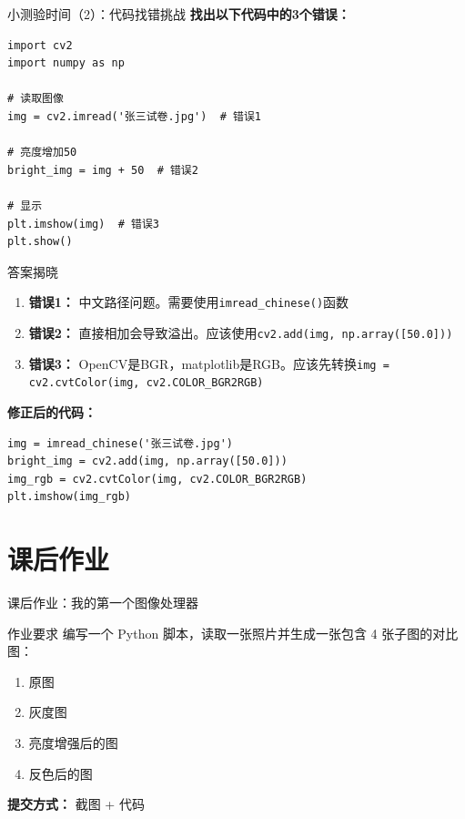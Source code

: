 \begin{frame}[fragile]{小测验时间（2）：代码找错挑战}
    \textbf{找出以下代码中的3个错误：}

    \begin{lstlisting}
import cv2
import numpy as np

# 读取图像
img = cv2.imread('张三试卷.jpg')  # 错误1

# 亮度增加50
bright_img = img + 50  # 错误2

# 显示
plt.imshow(img)  # 错误3
plt.show()
    \end{lstlisting}

    \vspace{0.3cm}
    \begin{block}{答案揭晓}
        \begin{enumerate}
            \item \textbf{错误1：} 中文路径问题。需要使用\texttt{imread\_chinese()}函数
            \item \textbf{错误2：} 直接相加会导致溢出。应该使用\texttt{cv2.add(img, np.array([50.0]))}
            \item \textbf{错误3：} OpenCV是BGR，matplotlib是RGB。应该先转换\texttt{img = cv2.cvtColor(img, cv2.COLOR\_BGR2RGB)}
        \end{enumerate}
    \end{block}

    \vspace{0.3cm}
    \begin{center}
        \textbf{修正后的代码：}
        \begin{lstlisting}
img = imread_chinese('张三试卷.jpg')
bright_img = cv2.add(img, np.array([50.0]))
img_rgb = cv2.cvtColor(img, cv2.COLOR_BGR2RGB)
plt.imshow(img_rgb)
        \end{lstlisting}
    \end{center}
\end{frame}


\section{课后作业}

\begin{frame}[fragile]{课后作业：我的第一个图像处理器}
    \begin{exampleblock}{作业要求}
        编写一个 Python 脚本，读取一张照片并生成一张包含 4 张子图的对比图：
        \begin{enumerate}
            \item 原图
            \item 灰度图
            \item 亮度增强后的图
            \item 反色后的图
        \end{enumerate}
    \end{exampleblock}
    \textbf{提交方式：} 截图 + 代码
\end{frame}

